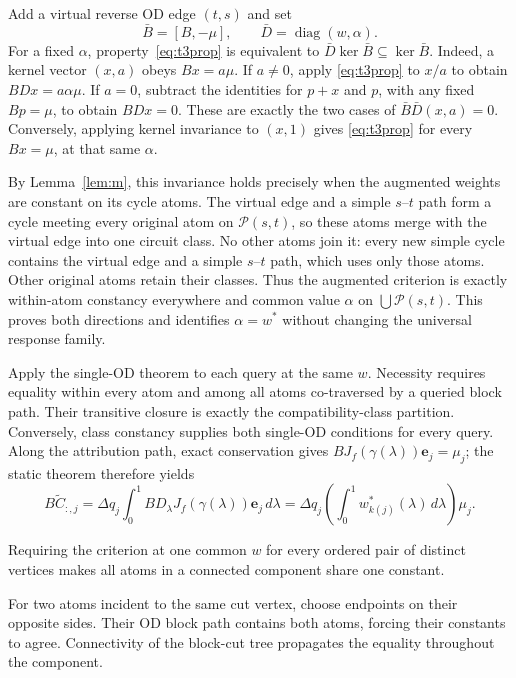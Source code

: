 \begin{pf}
Add a virtual reverse OD edge $(t,s)$ and set
\[
\bar B=[B,-\mu],\qquad \bar D=\operatorname{diag}(w,\alpha).
\]
For a fixed $\alpha$, property~\eqref{eq:t3prop} is equivalent to
$\bar D\ker\bar B\subseteq\ker\bar B$.
Indeed, a kernel vector $(x,a)$ obeys $Bx=a\mu$. If $a\ne0$,
apply \eqref{eq:t3prop} to $x/a$ to obtain $BDx=a\alpha\mu$.
If $a=0$, subtract the identities for $p+x$ and $p$, with any fixed
$Bp=\mu$, to obtain $BDx=0$. These are exactly the two cases of
$\bar B\bar D(x,a)=0$. Conversely, applying kernel invariance to
$(x,1)$ gives \eqref{eq:t3prop} for every $Bx=\mu$, at that same $\alpha$.

By Lemma~\ref{lem:m}, this invariance holds precisely when the augmented
weights are constant on its cycle atoms. The virtual edge and a simple
$s$--$t$ path form a cycle meeting every original atom on
$\mathcal P(s,t)$, so these atoms merge with the virtual edge into one
circuit class. No other atoms join it: every new simple cycle contains
the virtual edge and a simple $s$--$t$ path, which uses only those
atoms. Other original atoms retain their classes. Thus the augmented
criterion is exactly within-atom constancy everywhere and common value
$\alpha$ on $\bigcup\mathcal P(s,t)$. This proves both directions and
identifies $\alpha=w^*$ without changing the universal response family.
\end{pf}

\begin{pf}
Apply the single-OD theorem to each query at the same $w$. Necessity
requires equality within every atom and among all atoms co-traversed
by a queried block path. Their transitive closure is exactly the
compatibility-class partition. Conversely, class constancy supplies
both single-OD conditions for every query. Along the attribution
path, exact conservation gives $BJ_f(\gamma(\lambda))\mathbf e_j=\mu_j$;
the static theorem therefore yields
\[
B\widetilde C_{:,j}=\Delta q_j\int_0^1
BD_\lambda J_f(\gamma(\lambda))\mathbf e_j\,d\lambda
=\Delta q_j\left(\int_0^1w^*_{k(j)}(\lambda)\,d\lambda\right)\mu_j.
\]
\end{pf}

\begin{corollary}\label{cor:allod}
Requiring the criterion at one common $w$ for every ordered pair of
distinct vertices makes all atoms in a connected component share one
constant.
\end{corollary}
\begin{pf}
For two atoms incident to the same cut vertex, choose endpoints on
their opposite sides. Their OD block path contains both atoms, forcing
their constants to agree. Connectivity of the block-cut tree propagates
the equality throughout the component.
\end{pf}

